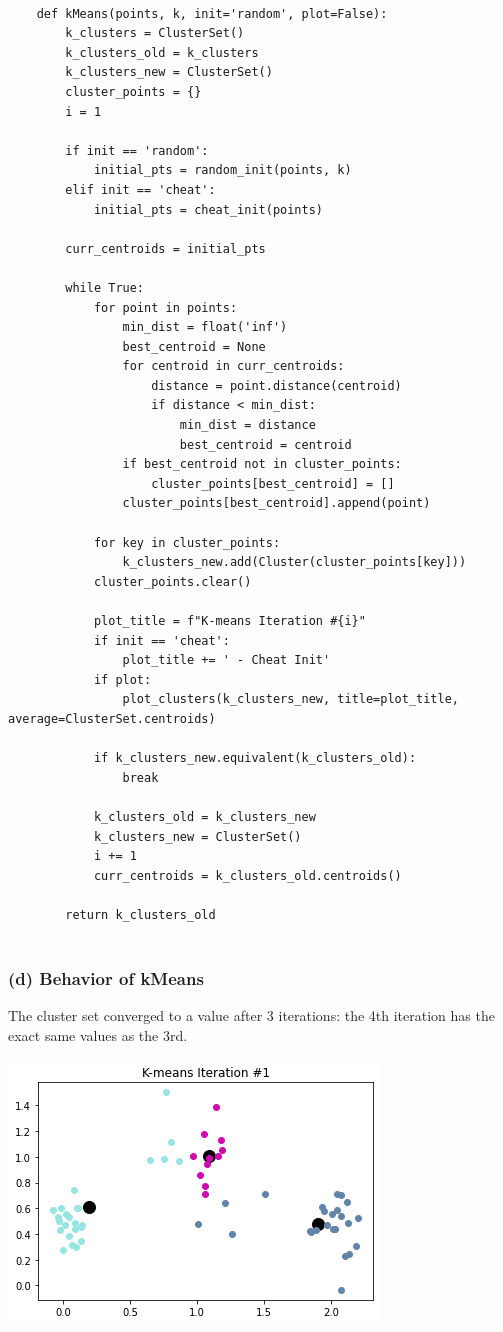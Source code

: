 \documentclass[11pt]{article}
\newcommand{\sol}[1]{{\bf{\color{magenta}{{Solution:}}}}}
\begin{document}
\begin{verbatim}
    
    def kMeans(points, k, init='random', plot=False):
        k_clusters = ClusterSet()
        k_clusters_old = k_clusters
        k_clusters_new = ClusterSet()
        cluster_points = {}
        i = 1
    
        if init == 'random':
            initial_pts = random_init(points, k)
        elif init == 'cheat':
            initial_pts = cheat_init(points)
    
        curr_centroids = initial_pts
    
        while True:
            for point in points:
                min_dist = float('inf')
                best_centroid = None
                for centroid in curr_centroids:
                    distance = point.distance(centroid)
                    if distance < min_dist:
                        min_dist = distance
                        best_centroid = centroid
                if best_centroid not in cluster_points:
                    cluster_points[best_centroid] = []
                cluster_points[best_centroid].append(point)
    
            for key in cluster_points:
                k_clusters_new.add(Cluster(cluster_points[key]))
            cluster_points.clear()
    
            plot_title = f"K-means Iteration #{i}"
            if init == 'cheat':
                plot_title += ' - Cheat Init'
            if plot:
                plot_clusters(k_clusters_new, title=plot_title, average=ClusterSet.centroids)
    
            if k_clusters_new.equivalent(k_clusters_old):
                break
    
            k_clusters_old = k_clusters_new
            k_clusters_new = ClusterSet()
            i += 1
            curr_centroids = k_clusters_old.centroids()
    
        return k_clusters_old
        
\end{verbatim}
\subsubsection{(d) Behavior of kMeans}
\sol x The cluster set converged to a value after 3 iterations: the 4th iteration has the exact same values as the 3rd.

\begin{center}
    \includegraphics[scale=0.6]{2d-1.png}
\end{center}
\end{document}
